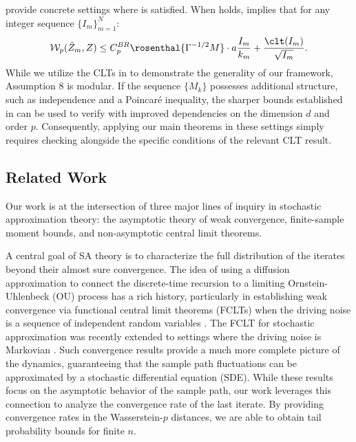 \documentclass[11pt]{article}
\begin{document}
 provide concrete settings where  is satisfied. When  holds,  implies that for any integer sequence $\{I_m\}_{m=1}^N$:
\begin{equation}\label{eq:clt_weighted_master}
    \mathcal{W}_p (\hat{Z}_m, Z) \leq  C_p^{BR} \rosenthal{\Gamma^{-1/2} M} \cdot a \frac{I_m}{k_m} + \frac{\clt(I_m)}{\sqrt{I_m}}.
\end{equation}
While we utilize the CLTs in  to demonstrate the generality of our framework, Assumption 8 is modular. If the sequence $\{M_k\}$ possesses additional structure, such as independence and a Poincaré inequality, the sharper bounds established in \citep{courtade2018existencesteinkernelsspectral,bonis2024improved} can be used to verify  with improved dependencies on the dimension $d$ and order $p$. Consequently, applying our main theorems in these settings simply requires checking  alongside the specific conditions of the relevant CLT result.










\subsection{Related Work}
Our work is at the intersection of three major lines of inquiry in stochastic approximation theory: the asymptotic theory of weak convergence, finite-sample moment bounds, and non-asymptotic central limit theorems. 



A central goal of SA theory is to characterize the full distribution of the iterates beyond their almost sure convergence.
The idea of using a diffusion approximation to connect the discrete-time recursion to a limiting Ornstein-Uhlenbeck (OU) process has a rich history, particularly in establishing weak convergence via functional central limit theorems (FCLTs) when the driving noise is a sequence of independent random variables \citep{pezeshki1997strong,joslin2000law,bucklew2002weak}.
The FCLT for stochastic approximation was recently extended to settings where the driving noise is Markovian \citep{borkar25}.
Such convergence results provide a much more complete picture of the dynamics, guaranteeing that the sample path fluctuations can be approximated by a stochastic differential equation (SDE). 
While these results focus on the asymptotic behavior of the sample path, our work leverages this connection to analyze the convergence rate of the last iterate. 
By providing convergence rates in the Wasserstein-$p$ distances, we are able to obtain tail probability bounds for finite $n$. 
\end{document}
